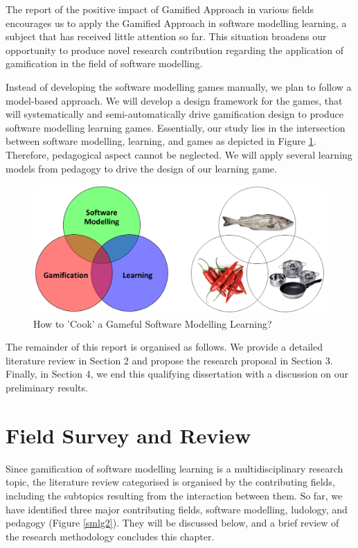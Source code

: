\documentclass[12pt, a4paper]{report}
\begin{document}
The report of the positive impact of Gamified Approach in various fields encourages us to apply the Gamified Approach in software modelling learning, a subject that has received little attention so far. This situation broadens our opportunity to produce novel research contribution regarding the application of gamification in the field of software modelling.  

Instead of developing the software modelling games manually, we plan to follow a model-based approach. We will develop a design framework for the games, that will systematically and semi-automatically drive gamification design to produce software modelling learning games. Essentially, our study lies in the intersection between software modelling, learning, and games as depicted in Figure \ref{smlg}. Therefore, pedagogical aspect cannot be neglected. We will apply several learning models from pedagogy to drive the design of our learning game. 

\begin{figure}[ht]
\centering
\includegraphics[width=\textwidth]{smlg}
\caption{How to 'Cook' a Gameful Software Modelling Learning?}
\label{smlg}
\end{figure}

The remainder of this report is organised as follows. We provide a detailed literature review in Section 2 and propose the research proposal in Section 3. Finally, in Section 4, we end this qualifying dissertation with a discussion on our preliminary results. 

\chapter{Field Survey and Review}
\label{Field Survey and Review}
Since gamification of software modelling learning is a multidisciplinary research topic, the literature review categorised is organised by the contributing fields, including the subtopics resulting from the interaction between them. So far, we have identified three major contributing fields, software modelling, ludology, and pedagogy (Figure \ref{smlg2}). They will be discussed below, and a brief review of the research methodology concludes this chapter.
\end{document}
